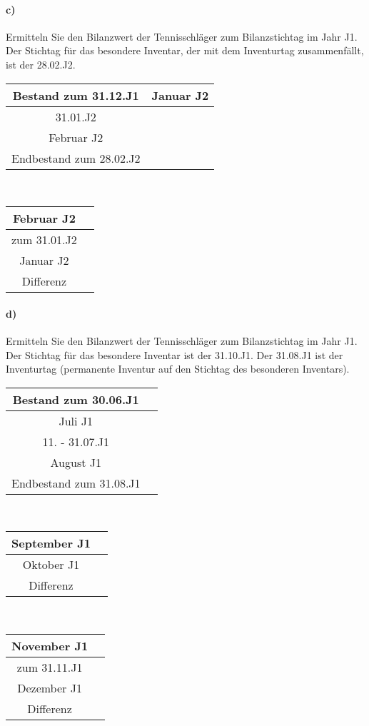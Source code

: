 \documentclass[paper=a4, fontsize=11pt]{scrartcl}
\numberwithin{equation}{section}
\numberwithin{figure}{section}
\numberwithin{table}{section}
\begin{document}
\paragraph{c)}

Ermitteln Sie den Bilanzwert der Tennisschläger zum Bilanzstichtag im Jahr J1. Der Stichtag für das besondere Inventar, der mit dem Inventurtag zusammenfällt, ist der 28.02.J2. \\

\begin{tabular}{c|c}
\hline
Bestand zum 31.12.J1 & 
\hline
Januar J2 & \\
\hline
31.01.J2 & \\
\hline
Februar J2 & \\
\hline
Endbestand zum 28.02.J2 & \\
\hline
\end{tabular}
\\

\begin{tabular}{c|c}
\hline
Februar J2 & \\
\hline
zum 31.01.J2 & \\
\hline
Januar J2 & \\
\hline 
Differenz & \\
\hline
\end{tabular}

\paragraph{d)}

Ermitteln Sie den Bilanzwert der Tennisschläger zum Bilanzstichtag im Jahr J1. Der Stichtag für das besondere Inventar ist der 31.10.J1. Der 31.08.J1 ist der Inventurtag (permanente Inventur auf den Stichtag des besonderen Inventars).  \\

\begin{tabular}{c|c}
\hline
Bestand zum 30.06.J1 & \\
\hline
Juli J1 & \\
\hline
11. - 31.07.J1 & \\
\hline
August J1 & \\
\hline
Endbestand zum 31.08.J1 & \\
\hline
\end{tabular}
\\

\begin{tabular}{c|c}
\hline
September J1 & \\
\hline
Oktober J1 & \\
\hline
Differenz & \\
\hline
\end{tabular}
\\

\begin{tabular}{c|c}
\hline
November J1 & \\
\hline
zum 31.11.J1 & \\
\hline
Dezember J1 & \\
\hline
Differenz & \\
\hline
\end{tabular}

\end{document}
